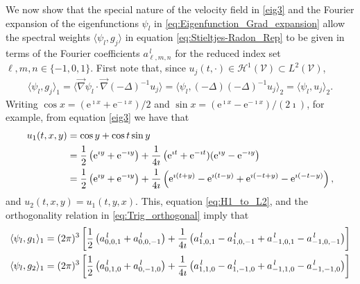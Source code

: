 \documentclass{article}
\newcommand{\e}{\mathrm{e}}
\newcommand{\Hc}{\mathcal{H}}
\newcommand{\Vc}{\mathcal{V}}
\newcommand{\0}{\mathbf{0}}
\newcommand{\1}{\mathbf{1}}
\newcommand{\2}{\mathbf{2}}
\newcommand{\3}{\mathbf{3}}
\newcommand{\4}{\mathbf{4}}
\newcommand{\5}{\mathbf{5}}
\newcommand{\6}{\mathbf{6}}
\newcommand{\7}{\mathbf{7}}
\newcommand{\8}{\mathbf{8}}
\begin{document}
We now show that the special nature of the velocity field in
\eqref{eig3} and the Fourier expansion of the eigenfunctions $\psi_l$ in  
\eqref{eq:Eigenfunction_Grad_expansion} allow the spectral weights
$\langle\psi_l,g_j\rangle$ in equation \eqref{eq:Stieltjes-Radon_Rep} to be given in
terms of the Fourier coefficients $a^{\,l}_{\ell,m,n}$ for the reduced
index set $\ell,m,n\in\{-1,0,1\}$. First note that, since
$u_j(t,\cdot)\in\Hc^1(\Vc)\subset L^2(\Vc)$,
%
\begin{align}\label{eq:H1_to_L2}
  \langle\psi_l,g_j\rangle_1=\langle\vec{\nabla}\psi_l\cdot\vec{\nabla}(-\Delta)^{-1}u_j\rangle
         =\langle\psi_l,(-\Delta)(-\Delta)^{-1}u_j\rangle_2
         =\langle\psi_l,u_j\rangle_2.
\end{align}
%
Writing
$\cos{x}=(\e^{\imath x}+\e^{-\imath x})/2$ and
$\sin{x}=(\e^{\imath x}-\e^{-\imath x})/(2\imath)$, for example, from equation
\eqref{eig3} we have that 
%
\begin{align}
  u_1(t,x,y)&=\cos{y}+\cos{t}\sin{y}\\
           &=\frac{1}{2}\left(\e^{\imath y}+\e^{-\imath y}\right)
            +\frac{1}{4\imath}\left(\e^{\imath t}+\e^{-\imath t})(\e^{\imath y}-\e^{-\imath y}\right)
            \notag\\
           &=\frac{1}{2}\left(\e^{\imath y}+\e^{-\imath y}\right)
            +\frac{1}{4\imath}\left(\e^{\imath(t+y)}-\e^{\imath(t-y)}+\e^{\imath(-t+y)}-\e^{\imath(-t-y)}\right), 
\end{align}
%
and $u_2(t,x,y)=u_1(t,y,x)$. This, equation \eqref{eq:H1_to_L2}, and the
orthogonality relation in \eqref{eq:Trig_orthogonal} imply that
%
\begin{align}
  \langle\psi_l,g_1\rangle_1=(2\pi)^3\left[\frac{1}{2}\left(a^{\,l}_{0,0,1}+a^{\,l}_{0,0,-1}\right)
               +\frac{1}{4\imath}\left(a^{\,l}_{1,0,1}-a^{\,l}_{1,0,-1}+a^{\,l}_{-1,0,1}-a^{\,l}_{-1,0,-1}\right) 
               \right]
               \notag\\
  \langle\psi_l,g_2\rangle_1=(2\pi)^3\left[\frac{1}{2}\left(a^{\,l}_{0,1,0}+a^{\,l}_{0,-1,0}\right)
               +\frac{1}{4\imath}\left(a^{\,l}_{1,1,0}-a^{\,l}_{1,-1,0}+a^{\,l}_{-1,1,0}-a^{\,l}_{-1,-1,0}\right) 
               \right]
\end{align}
%
\end{document}
